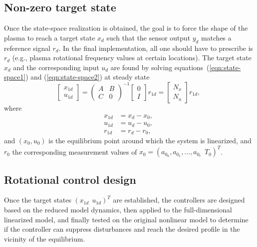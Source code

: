 \documentclass[12pt]{iopart}
\begin{document}
\subsection{Non-zero target state}
Once the state-space realization is obtained, the goal is to force the shape of the plasma to reach a target state $x_d$ such that the sensor output $y_d$ matches a reference signal $r_d$. In the final implementation, all one should have to prescribe is $r_d$ (e.g., plasma rotational frequency values at certain locations). The target state $x_d$ and the corresponding input $u_d$ are found by solving equations~(\ref{eqn:state-space1}) and (\ref{eqn:state-space2}) at steady state
\begin{equation}
\left[\! \begin{array}{c}  x_{1d} \\ u_{1d}\end{array}\!\right]
  ={ \left(\! \begin{array}{cc} A  & B \\ C & 0 \end{array} \! \right)}^{-1} \left[\! \begin{array}{c} 0 \\ I    \end{array}  \!\right] r_{1d} = \left[\! \begin{array}{c} N_x \\ N_u    \end{array}  \!\right] r_{1d},
\label{steadystate}
\end{equation}
where 
\begin{eqnarray}
 x_{1d}  &= x_d - x_0, \\
 u_{1d}  &= u_d - u_0, \\
 r_{1d}  &= r_d - r_0 ,
\end{eqnarray}
and $\left( x_0, u_0  \right)$ is the equilibrium point around which the system is linearized, and $r_0$ the corresponding measurement values of $x_0 = \left( a_{0_0},a_{0_1}, ... , a_{0_r} \ \ T_0 \right)^T$. 
 
\subsection{Rotational control design} 
Once the target states $\left( x_{1d} \ \  u_{1d} \right)^T$ are established, the controllers are designed based on the reduced model dynamics, then applied to the full-dimensional linearized model, and finally tested on the original nonlinear model to determine if the controller can suppress disturbances and reach the desired profile in the vicinity of the equilibrium.
\end{document}
